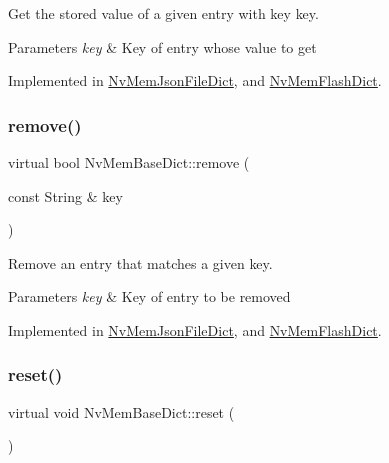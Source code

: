 Get the stored value of a given entry with key {\ttfamily key}. 


\begin{DoxyParams}{Parameters}
{\em key} & Key of entry whose value to get \\
\hline
\end{DoxyParams}


Implemented in \mbox{\hyperlink{class_nv_mem_json_file_dict_ab6f75e7c39abfb09f31217d2a4a1ae14}{Nv\+Mem\+Json\+File\+Dict}}, and \mbox{\hyperlink{class_nv_mem_flash_dict_a16eb803b23dc954a814ac2dc8580bd5e}{Nv\+Mem\+Flash\+Dict}}.

\mbox{\label{class_nv_mem_base_dict_a11d82ceaa4bb8b003080a1640ba40446}} 
\subsubsection{\texorpdfstring{remove()}{remove()}}
{\footnotesize\ttfamily virtual bool Nv\+Mem\+Base\+Dict\+::remove (\begin{DoxyParamCaption}\item[{const String \&}]{key }\end{DoxyParamCaption})\hspace{0.3cm}{\ttfamily [pure virtual]}}



Remove an entry that matches a given {\ttfamily key}. 


\begin{DoxyParams}{Parameters}
{\em key} & Key of entry to be removed \\
\hline
\end{DoxyParams}


Implemented in \mbox{\hyperlink{class_nv_mem_json_file_dict_a6e0bd4044fc8a65c10a1ed1da5dd8a55}{Nv\+Mem\+Json\+File\+Dict}}, and \mbox{\hyperlink{class_nv_mem_flash_dict_a1afddb8d0ae4cc6be96f83434763c26d}{Nv\+Mem\+Flash\+Dict}}.

\mbox{\label{class_nv_mem_base_dict_a1ae6a2c04b8adb81fc68e0abfd01c011}} 
\subsubsection{\texorpdfstring{reset()}{reset()}}
{\footnotesize\ttfamily virtual void Nv\+Mem\+Base\+Dict\+::reset (\begin{DoxyParamCaption}{ }\end{DoxyParamCaption})\hspace{0.3cm}{\ttfamily [pure virtual]}}



